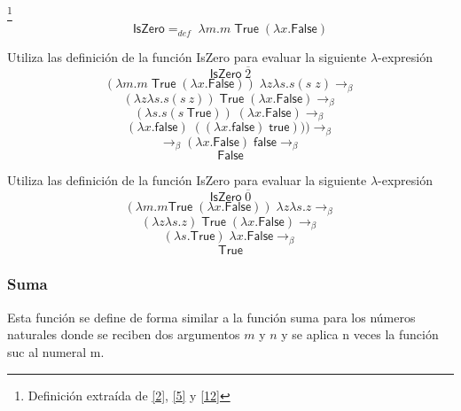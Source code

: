 	\begin{definition}\footnote{Definición extraída de \hyperlink{2}{[2]},  \hyperlink{5}{[5]} y \hyperlink{12}{[12]}}
            $$\textsf{IsZero} =_{def}  \; \lambda m. m\;\textsf{True} \;(\lambda x.\textsf{False})$$
        \end{definition}

        \begin{exercise}
            Utiliza las definición de la función \textsf{IsZero} para evaluar la siguiente $\lambda$-expresión
            \[
                \textsf{IsZero}  \; \overline{2}
            \]
            \[
                (\lambda m. m\;\textsf{True} \;(\lambda x.\textsf{False})) \; \lambda z\lambda s.s(s\;z) \rightarrow_\beta 
            \]
		\[
			(\lambda z\lambda s.s(s\:z)) \; \textsf{True} \; (\lambda x.\textsf{False})  \rightarrow_\beta 
		\]
            \[
                	(\lambda s.s(s\: \textsf{True})) \; (\lambda x.\textsf{False}) \rightarrow_\beta  
            \]
		\[
			(\lambda x.\textsf{false}) \; ((\lambda x.\textsf{false}) \; \textsf{true}))) \rightarrow_\beta  
		\]
            \[
                 \rightarrow_\beta  (\lambda x.\textsf{False}) \; \textsf{false} \rightarrow_\beta 
            \]
		\[
			\textsf{False}
		\]

        \end{exercise}

        \begin{exercise}
            Utiliza las definición de la función \textsf{IsZero} para evaluar la siguiente $\lambda$-expresión
            \[
                \textsf{IsZero} \; \overline{0}
            \]
            \[
                (\lambda m. m\textsf{True} \; (\lambda x.\textsf{False})) \; \lambda z\lambda s.z \rightarrow_\beta 
            \]
		\[
			(\lambda z\lambda s.z) \; \textsf{True} \; (\lambda x.\textsf{False}) \rightarrow_\beta 
		\]
            \[
                   (\lambda s.\textsf{True}) \; \lambda x.\textsf{False} \rightarrow_\beta 
            \]
		\[
			\textsf{True}
		\]
        \end{exercise}
        

    \subsubsection{Suma}
        Esta función se define de forma similar a la función suma para los números naturales  donde se reciben dos argumentos $m$ y $n$ y se aplica n veces la función \textsf{suc} al numeral m.

